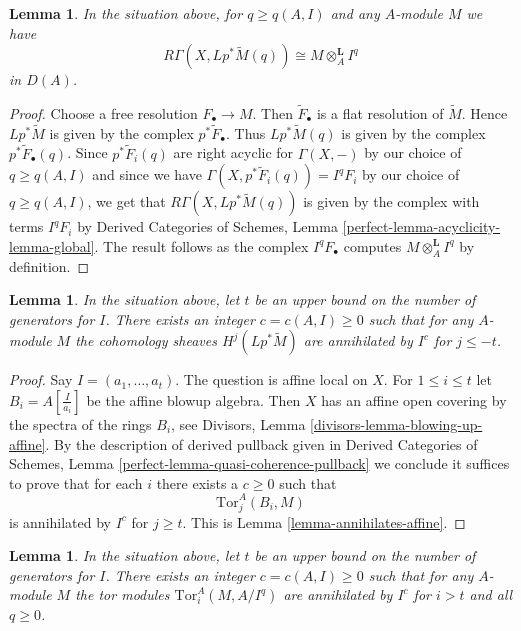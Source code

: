 \documentclass{stacks-project}
\theoremstyle{plain}
\newtheorem{lemma}[subsection]{Lemma}
\theoremstyle{definition}
\theoremstyle{remark}
\numberwithin{equation}{subsection}
\begin{document}
\begin{lemma}
\label{lemma-compute-tor-Iq}
In the situation above, for $q \geq q(A, I)$ and any $A$-module $M$ we have
$$
R\Gamma(X, Lp^*\widetilde{M}(q)) \cong M \otimes_A^\mathbf{L} I^q
$$
in $D(A)$.
\end{lemma}

\begin{proof}
Choose a free resolution $F_\bullet \to M$. Then $\widetilde{F}_\bullet$
is a flat resolution of $\widetilde{M}$. Hence $Lp^*\widetilde{M}$
is given by the complex $p^*\widetilde{F}_\bullet$. Thus
$Lp^*\widetilde{M}(q)$ is given by the complex $p^*\widetilde{F}_\bullet(q)$.
Since $p^*\widetilde{F}_i(q)$ are right acyclic for $\Gamma(X, -)$ by
our choice of $q \geq q(A, I)$ and since we have
$\Gamma(X, p^*\widetilde{F}_i(q)) = I^qF_i$ by our choice of $q \geq q(A, I)$,
we get that $R\Gamma(X, Lp^*\widetilde{M}(q))$ is given by the complex
with terms $I^qF_i$ by Derived Categories of Schemes, Lemma
\ref{perfect-lemma-acyclicity-lemma-global}.
The result follows as the complex $I^qF_\bullet$ computes
$M \otimes_A^\mathbf{L} I^q$ by definition.
\end{proof}

\begin{lemma}
\label{lemma-annihilates}
In the situation above, let $t$ be an upper bound on the number of
generators for $I$. There exists an integer $c = c(A, I) \geq 0$
such that for any $A$-module $M$ the cohomology sheaves
$H^j(Lp^*\widetilde{M})$ are annihilated by $I^c$ for $j \leq -t$.
\end{lemma}

\begin{proof}
Say $I = (a_1, \ldots, a_t)$. The question is affine local on $X$.
For $1 \leq i \leq t$ let $B_i = A[\frac{I}{a_i}]$ be the affine
blowup algebra. Then $X$ has an affine open covering by
the spectra of the rings $B_i$, see
Divisors, Lemma \ref{divisors-lemma-blowing-up-affine}.
By the description of derived pullback given in
Derived Categories of Schemes, Lemma
\ref{perfect-lemma-quasi-coherence-pullback}
we conclude it suffices to prove that for each $i$ there exists a $c \geq 0$
such that
$$
\text{Tor}_j^A(B_i, M)
$$
is annihilated by $I^c$ for $j \geq t$. This is
Lemma \ref{lemma-annihilates-affine}.
\end{proof}

\begin{lemma}
\label{lemma-annihilates-tors}
In the situation above, let $t$ be an upper bound on the number of
generators for $I$. There exists an integer $c = c(A, I) \geq 0$
such that for any $A$-module $M$ the tor modules
$\text{Tor}_i^A(M, A/I^q)$ are annihilated by $I^c$ for $i > t$
and all $q \geq 0$.
\end{lemma}
\end{document}
